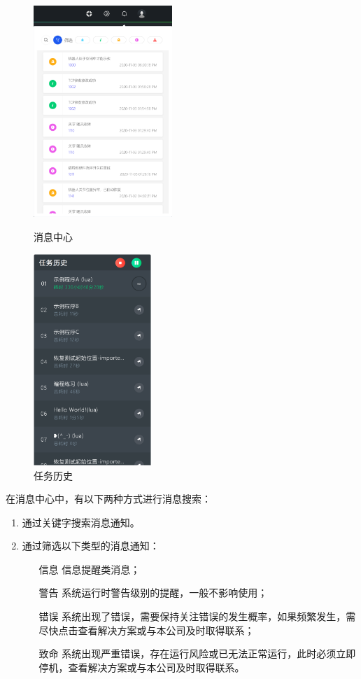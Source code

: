 \begin{figure}[htb]
	\centering
	\begin{minipage}[t]{0.55\linewidth}
		\centering
		\includegraphics[height=8cm]{screen/2-14.png}
		\caption{消息中心}
		\label{fig:消息中心}
	\end{minipage}
	\hfill
	\begin{minipage}[t]{0.4\linewidth}
		\centering
		\includegraphics[height=8cm]{screen/2-15.png}
		\caption{任务历史}
		\label{fig:任务历史}
	\end{minipage}
\end{figure}
在消息中心中，有以下两种方式进行消息搜索：
\begin{enumerate}
	\item 通过关键字搜索消息通知。
	\item 通过筛选以下类型的消息通知：
	\begin{itemize}
\item[\icn{image/29.pdf} 信息] 信息提醒类消息；
\item[\icn{image/28.pdf} 警告] 系统运行时警告级别的提醒，一般不影响使用；
\item[\icn{image/27.pdf} 错误] 系统出现了错误，需要保持关注错误的发生概率，如果频繁发生，需尽快点击查看解决方案或与本公司及时取得联系；
\item[\icn{image/26.pdf} 致命] 系统出现严重错误，存在运行风险或已无法正常运行，此时必须立即停机，查看解决方案或与本公司及时取得联系。
	\end{itemize}
\end{enumerate}

